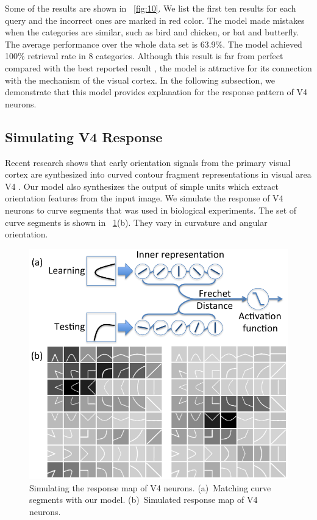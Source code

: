 \documentclass[10pt,letterpaper]{article}
\begin{document}
Some of the results are shown in \figurename~\ref{fig:10}.
We list the first ten results for each query and the incorrect ones are marked in red color.
The model made mistakes when the categories are similar, such as bird and chicken, or bat and butterfly.
The average performance over the whole data set is 63.9\%.
The model achieved 100\% retrieval rate in 8 categories.
Although this result is far from perfect compared with the best reported result \cite{bai2010},
the model is attractive for its connection with the mechanism of the visual cortex.
In the following subsection, we demonstrate that this model provides explanation
for the response pattern of V4 neurons.

\subsection{Simulating V4 Response}

Recent research shows that early orientation signals from the primary visual cortex
are synthesized into curved contour fragment representations in visual area V4 \cite{yau2012}.
Our model also synthesizes the output of simple units which extract orientation features from the input image.
We simulate the response of V4 neurons to curve segments that was used in biological experiments.
The set of curve segments is shown in \figurename~\ref{fig:11}(b).
They vary in curvature and angular orientation.

\begin{figure}[ht]
\begin{center}
\includegraphics[width=0.98\linewidth]{images/fig11.png}
\end{center}
\caption{Simulating the response map of V4 neurons.
(a)~Matching curve segments with our model.
(b)~Simulated response map of V4 neurons.} 
\label{fig:11}
\end{figure}
\end{document}
